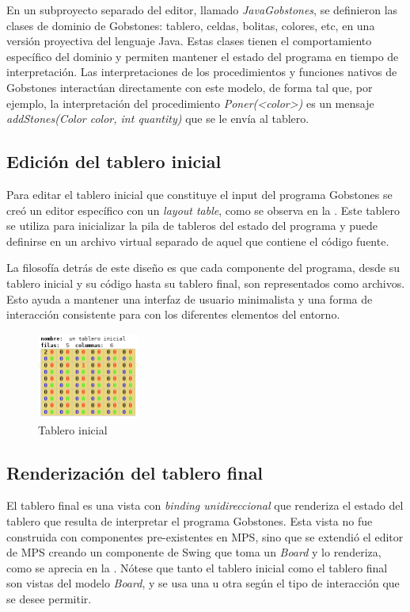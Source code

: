 En un subproyecto separado del editor, llamado \textit{JavaGobstones}, se definieron las clases de dominio de Gobstones: tablero, celdas, bolitas, colores, etc, en una versión proyectiva del lenguaje Java. Estas clases tienen el comportamiento específico del dominio y permiten mantener el estado del programa en tiempo de interpretación. Las interpretaciones de los procedimientos y funciones nativos de Gobstones interactúan directamente con este modelo, de forma tal que, por ejemplo, la interpretación del procedimiento \textit{Poner(<color>)} es un mensaje \textit{addStones(Color color, int quantity)} que se le envía al tablero.

\subsection{Edición del tablero inicial}

Para editar el tablero inicial que constituye el input del programa Gobstones se creó un editor específico con un \textit{layout table}, como se observa en la . Este tablero se utiliza para inicializar la pila de tableros del estado del programa y puede definirse en un archivo virtual separado de aquel que contiene el código fuente. 

La filosofía detrás de este diseño es que cada componente del programa, desde su tablero inicial y su código hasta su tablero final, son representados como archivos. Esto ayuda a mantener una interfaz de usuario minimalista y una forma de interacción consistente para con los diferentes elementos del entorno.

\begin{figure}[hb]
\centering
\includegraphics[width=0.3\textwidth]{assets/initial_board}
\caption{Tablero inicial}
\label{fig:initial_board}
\end{figure}


\subsection{Renderización del tablero final}

El tablero final es una vista con \textit{binding unidireccional} que renderiza el estado del tablero que resulta de interpretar el programa Gobstones. Esta vista no fue construida con componentes pre-existentes en MPS, sino que se extendió el editor de MPS creando un componente de Swing que toma un \textit{Board} y lo renderiza, como se aprecia en la . Nótese que tanto el tablero inicial como el tablero final son vistas del modelo \textit{Board}, y se usa una u otra según el tipo de interacción que se desee permitir.

